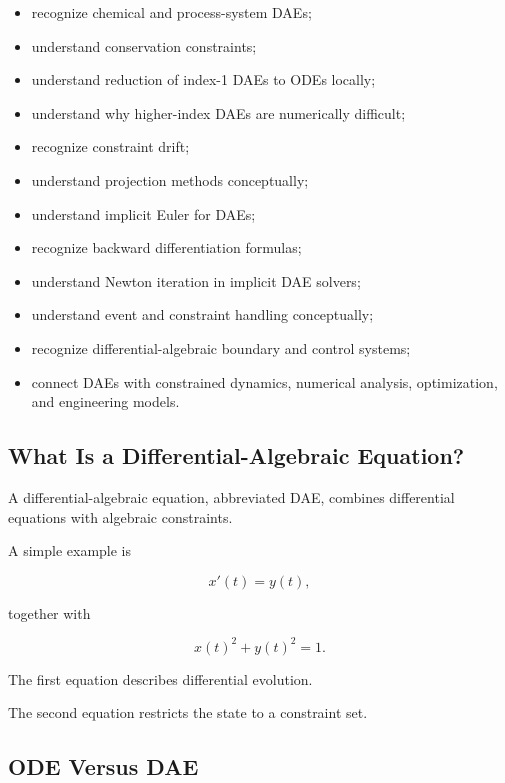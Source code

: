 {\begin{itemize}
    \item recognize chemical and process-system DAEs;
    \item understand conservation constraints;
    \item understand reduction of index-1 DAEs to ODEs locally;
    \item understand why higher-index DAEs are numerically difficult;
    \item recognize constraint drift;
    \item understand projection methods conceptually;
    \item understand implicit Euler for DAEs;
    \item recognize backward differentiation formulas;
    \item understand Newton iteration in implicit DAE solvers;
    \item understand event and constraint handling conceptually;
    \item recognize differential-algebraic boundary and control systems;
    \item connect DAEs with constrained dynamics, numerical analysis,
          optimization, and engineering models.
\end{itemize}
}

\subsection{What Is a Differential-Algebraic Equation?}
\label{subsec:what-is-dae}

A differential-algebraic equation, abbreviated DAE, combines differential
equations with algebraic constraints.

A simple example is

\[
\boxed{
x'(t)=y(t),
}
\]

together with

\[
\boxed{
x(t)^2+y(t)^2=1.
}
\]

The first equation describes differential evolution.

The second equation restricts the state to a constraint set.

\subsection{ODE Versus DAE}
\label{subsec:ode-versus-dae}

